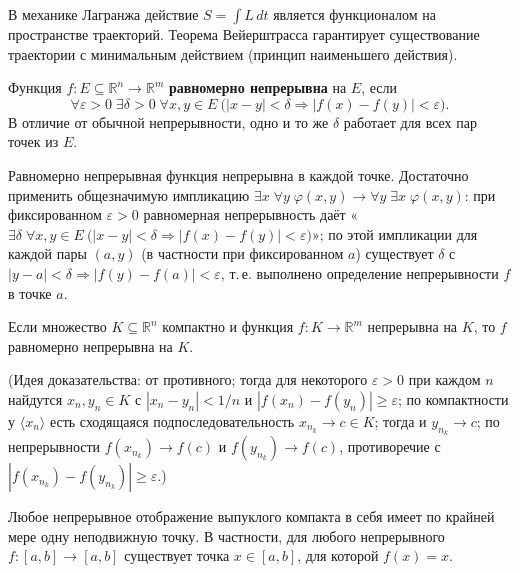 \documentclass[11pt, a4paper]{extarticle}
\newcommand{\de}{\delta}
\newcommand{\ep}{\varepsilon}
\newcommand{\ph}{\varphi}
\newcommand{\R}{{\mathbb R}}
\renewcommand{\ge}{\geqslant}
\begin{document}
\begin{example}
В механике Лагранжа действие $S = \int L \, dt$ является функционалом на пространстве траекторий. Теорема Вейерштрасса гарантирует существование траектории с минимальным действием (принцип наименьшего действия).
\end{example}

\begin{definition}
Функция $f: E \subseteq \R^n \to \R^m$ \textbf{равномерно непрерывна} на $E$, если
$$\forall \ep > 0\; \exists \de > 0\; \forall x, y \in E\ \bigl( |x - y| < \de \Rightarrow |f(x) - f(y)| < \ep \bigr).$$
В отличие от обычной непрерывности, одно и то же $\de$ работает для всех пар точек из $E$.
\end{definition}

\begin{remark}
Равномерно непрерывная функция непрерывна в каждой точке. Достаточно применить общезначимую импликацию $\exists x\; \forall y\; \ph(x,y) \to \forall y\; \exists x\; \ph(x,y)$: при фиксированном $\ep > 0$ равномерная непрерывность даёт «$\exists \de\; \forall x,y \in E\ \bigl( |x-y| < \de \Rightarrow |f(x)-f(y)| < \ep \bigr)$»; по этой импликации для каждой пары $(a,y)$ (в частности при фиксированном $a$) существует $\de$ с $|y - a| < \de \Rightarrow |f(y) - f(a)| < \ep$, т.\,е. выполнено определение непрерывности $f$ в точке $a$.
\end{remark}

\begin{theorem}
Если множество $K \subseteq \R^n$ компактно и функция $f: K \to \R^m$ непрерывна на $K$, то $f$ равномерно непрерывна на $K$.
\end{theorem}
(Идея доказательства: от противного; тогда для некоторого $\ep > 0$ при каждом $n$ найдутся $x_n, y_n \in K$ с $|x_n - y_n| < 1/n$ и $|f(x_n) - f(y_n)| \ge \ep$; по компактности у $\langle x_n \rangle$ есть сходящаяся подпоследовательность $x_{n_k} \to c \in K$; тогда и $y_{n_k} \to c$; по непрерывности $f(x_{n_k}) \to f(c)$ и $f(y_{n_k}) \to f(c)$, противоречие с $|f(x_{n_k}) - f(y_{n_k})| \ge \ep$.)

\begin{theorem}
Любое непрерывное отображение выпуклого компакта в себя имеет по крайней мере одну неподвижную точку. В частности, для любого непрерывного $f: [a, b] \to [a, b]$ существует точка $x \in [a, b]$, для которой $f(x) = x$.
\end{theorem}
    
\end{document}
